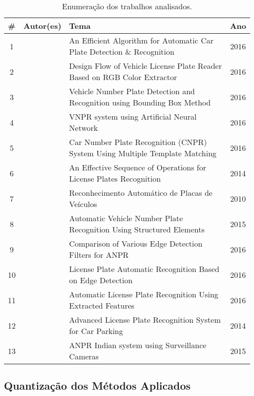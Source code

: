 \begin{table}[htb]
	\ABNTEXfontereduzida
	\caption[\footnotesize Enumeração dos trabalhos analisados.]{\footnotesize Enumeração dos trabalhos analisados.}
	\label{tab:correla}
	\begin{tabular}{c|c|p{6cm}|c}
		\hline
		\textbf{\#} & \textbf{Autor(es)} & \textbf{Tema} & \textbf{Ano}\\
		\hline \hline
		1 & \cite{agarwal2016} & An Efficient Algorithm for Automatic Car Plate Detection \& Recognition & 2016 \\
		\hline
		2 & \cite{jia2016} & Design Flow of Vehicle License Plate Reader Based on RGB Color Extractor & 2016 \\
		\hline
		3 & \cite{babu2016} & Vehicle Number Plate Detection and Recognition using Bounding Box Method & 2016 \\
		\hline
		4 & \cite{george2016} & VNPR system using Artificial Neural Network & 2016 \\
		\hline
		5 & \cite{khan2016} & Car Number Plate Recognition (CNPR) System Using Multiple Template Matching & 2016 \\
		\hline
		6 & \cite{ikeizumie2014} & An Effective Sequence of Operations for License Plates Recognition & 2014 \\
		\hline
		7 & \cite{trentini2010} & Reconhecimento Automático de Placas de Veículos & 2010 \\
		\hline
		8 & \cite{islam2015} & Automatic Vehicle Number Plate Recognition Using	Structured Elements & 2015 \\
		\hline
		9 & \cite{khan2016comparison} & Comparison of Various Edge Detection Filters for ANPR & 2016 \\
		\hline
		10 & \cite{ha2016} & License Plate Automatic Recognition Based on Edge Detection & 2016 \\
		\hline
		11 & \cite{saleem2016} & Automatic License Plate Recognition Using Extracted Features & 2016 \\
		\hline
		12 & \cite{sen2014} & Advanced License Plate Recognition System for	Car Parking & 2014 \\
		\hline
		13 & \cite{singh2015} & ANPR Indian system using Surveillance Cameras & 2015 \\
		\hline \hline
	\end{tabular}
\end{table} 

\subsection{\textbf{Quantização dos Métodos Aplicados}}

